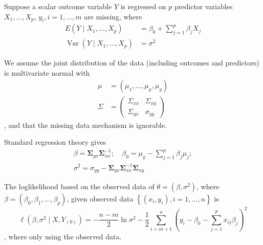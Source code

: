 \begin{example}
	Suppose a scalar outcome variable $Y$ is regressed on $p$ predictor variables $X_{1},\ldots,X_{p}$, $y_{i},i=1,\ldots,m$ are missing, where
	\begin{equation}
		\begin{aligned}
			E\left(Y \mid X_{1}, \ldots, X_{p}\right)                  & =\beta_{0}+\sum_{j=1}^{p} \beta_{j} X_{j} \\
			\operatorname{Var}\left(Y \mid X_{1}, \ldots, X_{p}\right) & =\sigma^{2}
		\end{aligned}
	\end{equation}

	We assume the joint distribution of the data (including outcomes and predictors) is multivariate normal with
	\begin{equation}
		\begin{aligned}
			\mu    & =\left(\mu_{1}, \ldots, \mu_{p}, \mu_{y}\right) \\
			\Sigma & =\left(\begin{array}{ll}
				                \Sigma_{x x} & \Sigma_{x y} \\
				                \Sigma_{y x} & \sigma_{y y}
			                \end{array}\right)
		\end{aligned}
	\end{equation}
	, and that the missing data mechanism is ignorable.

	Standard regression theory gives
	\begin{equation}
		\begin{array}{c}
			\beta=\boldsymbol{\Sigma}_{y x} \boldsymbol{\Sigma}_{x x}^{-1} ; \quad \beta_{0}=\mu_{y}-\sum_{j=1}^{p} \beta_{j} \mu_{j} ; \\
			\sigma^{2}=\sigma_{y y}-\boldsymbol{\Sigma}_{y x} \boldsymbol{\Sigma}_{x x}^{-1} \boldsymbol{\Sigma}_{x y}
		\end{array}
	\end{equation}

	The loglikelihood based on the observed data of $\theta=\left(\beta,\sigma^{2}\right)$, where $\beta=\left(\beta_{0},\beta_{1},\ldots,\beta_{p}\right)$, given observed data $\left\{\left(x_{i},y_{i}\right),i=1,\ldots,n\right\}$ is
	\begin{equation}
		\ell(\beta, \sigma^{2} \mid X, Y_{(0)})=-\frac{n-m}{2}\ln\sigma^2-\frac{1}{2}\sum_{i=m+1}^{n}\left(y_{i}-\beta_{0}-\sum_{j=1}^{p}x_{ij}\beta_{j}\right)^2
	\end{equation}
	, where only using the observed data.


\end{example}
